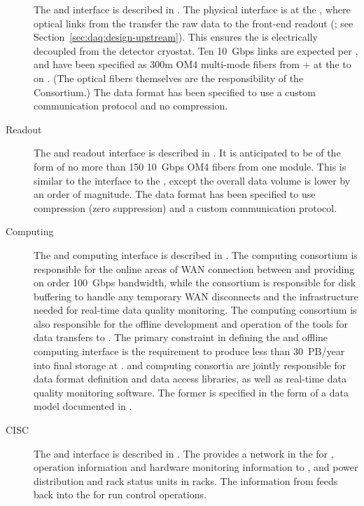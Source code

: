\begin{description}
\item[ ] The  and   interface is described in
. The physical interface is at the , where optical links from the  transfer
the raw  data to the  front-end readout (; see
Section~\ref{sec:daq:design-upstream}). This ensures the  is electrically decoupled from the detector
cryostat. Ten \SI{10}{Gbps} links are expected per , and have
been specified as 300m OM4 multi-mode fibers from + at the  to
 on . (The optical fibers themselves are
the responsibility of the  Consortium.) The data format has been specified
to use a custom communication protocol and no
compression.

\item[ Readout] The  and  readout interface is described in
. It is anticipated to
be of the form of no more than 150  \SI{10}{Gbps} OM4 fibers from one  module. 
This
is similar to the interface to the  , except the overall
data volume is lower by an order of magnitude. The data format has been specified to use
compression (zero suppression) and a custom communication protocol.

\item[Computing] The  and computing interface is described in .
 The computing consortium
 is responsible for the online areas of WAN connection between \surf and
\fnal providing on order \SI{100}{Gbps} bandwidth, while the  consortium is responsible for disk buffering
to handle any temporary WAN disconnects and the infrastructure needed
for real-time data quality monitoring.  The computing consortium 
is also
responsible for the offline development and operation of the tools for data
transfers to \fnal. The primary
constraint in defining the  and offline computing interface is the
requirement to produce less than \SI{30}{PB/year} 
into final storage at
\fnal.  and
computing consortia are jointly responsible for data
format definition and data access libraries, as well as real-time data
quality monitoring software. The former is specified in the form of a 
data model documented in .

\item[CISC] The  and  interface is described in
. The  provides a network in the  for ,  operation information and hardware
monitoring information to , and power distribution and
rack status units in  racks. The information from 
feeds back into the  for run control operations.


\end{description}

